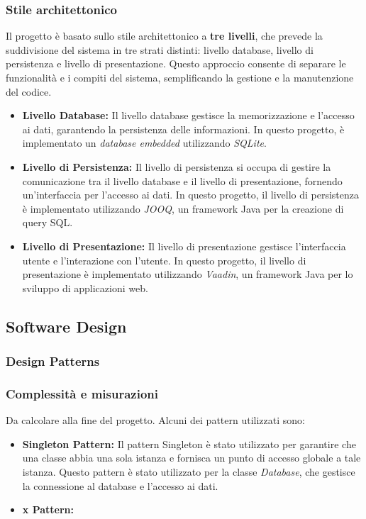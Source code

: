 \documentclass[a4paper,12pt]{article}
\begin{document}
\subsubsection{Stile architettonico}
Il progetto è basato sullo stile architettonico a \textbf{tre livelli}, che prevede la suddivisione del sistema in tre strati distinti: livello database, livello di persistenza e livello di presentazione. Questo approccio consente di separare le funzionalità e i compiti del sistema, semplificando la gestione e la manutenzione del codice.
\begin{itemize}
    \item \textbf{Livello Database:} 
    Il livello database gestisce la memorizzazione e l'accesso ai dati, garantendo la persistenza delle informazioni. In questo progetto, è implementato un \textit{database embedded} utilizzando \textit{SQLite}.
    \item \textbf{Livello di Persistenza:} 
    Il livello di persistenza si occupa di gestire la comunicazione tra il livello database e il livello di presentazione, fornendo un'interfaccia per l'accesso ai dati. In questo progetto, il livello di persistenza è implementato utilizzando \textit{JOOQ}, un framework Java per la creazione di query SQL.   
    \item \textbf{Livello di Presentazione:} 
    Il livello di presentazione gestisce l'interfaccia utente e l'interazione con l'utente. In questo progetto, il livello di presentazione è implementato utilizzando \textit{Vaadin}, un framework Java per lo sviluppo di applicazioni web.
\end{itemize}
\subsection{Software Design}

\subsubsection{Design Patterns}
\subsubsection{Complessità e misurazioni}
Da calcolare alla fine del progetto. 
Alcuni dei pattern utilizzati sono:
\begin{itemize}
    \item \textbf{Singleton Pattern:} 
    Il pattern Singleton è stato utilizzato per garantire che una classe abbia una sola istanza e fornisca un punto di accesso globale a tale istanza. Questo pattern è stato utilizzato per la classe \textit{Database}, che gestisce la connessione al database e l'accesso ai dati.    
    \item \textbf{x Pattern:}
\end{itemize}
\end{document}
